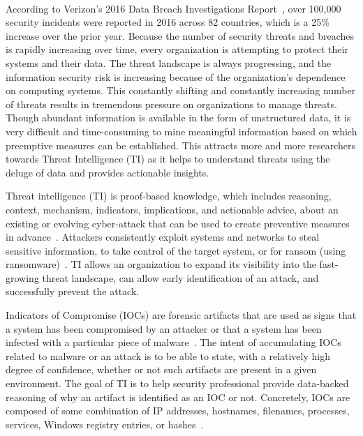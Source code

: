 \paragraph{}
According to Verizon's 2016 Data Breach Investigations Report~\cite{verizon}, over 100,000 security incidents were reported in 2016 across 82 countries, which is a 25\% increase over the prior year. Because the number of security threats and breaches is rapidly increasing over time, every organization is attempting to protect their systems and their data. The threat landscape is always progressing, and the information security risk is increasing because of the organization's dependence on computing systems. This constantly shifting and constantly increasing number of threats results in tremendous pressure on organizations to manage threats.
Though abundant information is available in the form of unstructured data, it is very difficult and time-consuming to mine meaningful information based on which preemptive measures can be established. This attracts more and more researchers towards Threat Intelligence (TI) as it helps to understand threats using the deluge of data and provides actionable insights.

Threat intelligence (TI) is proof-based knowledge, which includes reasoning, context, mechanism, indicators, implications, and actionable advice, about an existing or evolving cyber-attack that can be used to create preventive measures in advance~\cite{rob}.  Attackers consistently exploit systems and networks to steal sensitive information, to take control of the target system, or for ransom (using ransomware)~\cite{gorman}. TI allows an organization to expand its visibility into the fast-growing threat landscape, can allow early identification of an attack, and successfully prevent the attack. 

Indicators of Compromise (IOCs) are forensic artifacts that are used as signs that a system has been compromised by an attacker or that a system has been infected with a particular piece of malware~\cite{catakoglu}. The intent of accumulating IOCs related to malware or an attack is to be able to state, with a relatively high degree of confidence, whether or not such artifacts are present in a given environment. The goal of TI is to help security professional provide data-backed reasoning of why an artifact is identified as an IOC or not. Concretely, IOCs are composed of some combination of IP addresses, hostnames, filenames, processes, services, Windows registry entries, or hashes~\cite{andress}.

